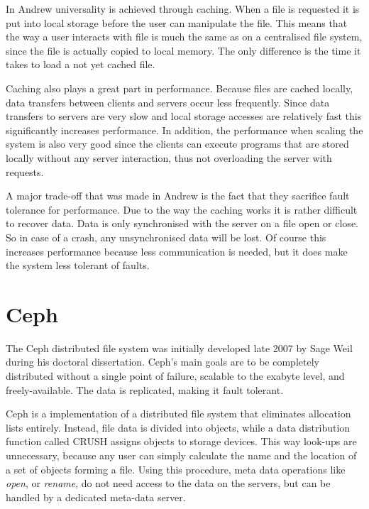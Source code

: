 \documentclass[a4paper,12px]{article}
\begin{document}
In Andrew universality is achieved through caching. When a file is requested it
is put into local storage before the user can manipulate the file. This means
that the way a user interacts with file is much the same as on a centralised
file system, since the file is actually copied to local memory. The only
difference is the time it takes to load a not yet cached file.\cite{concepts}

Caching also plays a great part in performance. Because files are cached
locally, data transfers between clients and servers occur less frequently. Since
data transfers to servers are very slow and local storage accesses are
relatively fast this significantly increases performance. In addition, the
performance when scaling the system is also very good since the clients can
execute programs that are stored locally without any server interaction, thus
not overloading the server with requests.\cite{andrew}

A major trade-off that was made in Andrew is the fact that they sacrifice fault
tolerance for performance. Due to the way the caching works it is rather
difficult to recover data. Data is only synchronised with the server on a file
open or close.\cite{andrew} So in case of a crash, any unsynchronised data will
be lost.  Of course this increases performance because less communication is
needed, but it does make the system less tolerant of faults.

\section{Ceph}

The Ceph distributed file system \cite{weil2006ceph} was initially developed
late 2007 by Sage Weil during his doctoral dissertation. Ceph's main goals are
to be completely distributed without a single point of failure, scalable to the
exabyte level, and freely-available. The data is replicated, making it fault
tolerant.

Ceph is a implementation of a distributed file system that eliminates allocation
lists entirely. Instead, file data is divided into objects, while a data
distribution function called CRUSH assigns objects to storage devices. This way
look-ups are unnecessary, because any user can simply calculate the name and
the location of a set of objects forming a file.  Using this procedure, meta
data operations like \textit{open}, or \textit{rename}, do not need access to
the data on the servers, but can be handled by a dedicated meta-data
server\cite{weil2006ceph}.
\end{document}
